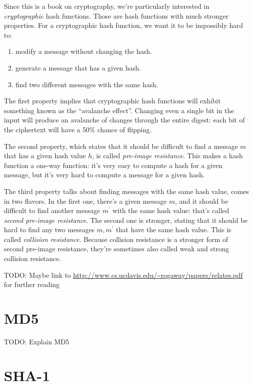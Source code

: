 \documentclass[11pt,ebook,table,dvipsnames]{memoir}
\begin{document}
Since this is a book on cryptography, we're particularly interested
in \emph{cryptographic} hash functions. Those are hash functions with much
stronger properties. For a cryptographic hash function, we want it to
be impossibly hard to:

\begin{enumerate}
\item modify a message without changing the hash.
\item generate a message that has a given hash.
\item find two different messages with the same hash.
\end{enumerate}

The first property implies that cryptographic hash functions will
exhibit something known as the \enquote{avalanche effect}. Changing even a
single bit in the input will produce an avalanche of changes through
the entire digest: each bit of the ciphertext will have a 50\% chance
of flipping.

The second property, which states that it should be difficult to find
a message $m$ that has a given hash value $h$, is called \emph{pre-image
resistance}. This makes a hash function a one-way function: it's very
easy to compute a hash for a given message, but it's very hard to
compute a message for a given hash.

The third property talks about finding messages with the same hash
value, comes in two flavors. In the first one, there's a given message
$m$, and it should be difficult to find another message $m^{\prime}$
with the same hash value: that's called \emph{second pre-image resistance}.
The second one is stronger, stating that it should be hard to find any
two messages $m, m^{\prime}$ that have the same hash value. This is
called \emph{collision resistance}. Because collision resistance is a
stronger form of second pre-image resistance, they're sometimes also
called weak and strong collision resistance.

TODO: Maybe link to
\url{http://www.cs.ucdavis.edu/~rogaway/papers/relates.pdf} for further reading
\section{MD5}
\label{sec-2-6-2}

TODO: Explain MD5
\section{SHA-1}
\label{sec-2-6-3}
\end{document}
